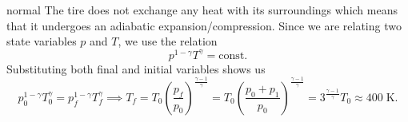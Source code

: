 \begin{solution}{normal}
The tire does not exchange any heat with its surroundings which means that it undergoes an adiabatic expansion/compression. Since we are relating two state variables $p$ and $T$, we use the relation
\[p^{1 - \gamma}T^{\gamma} = \text{const.}\]Substituting both final and initial variables shows us
\[p_0^{1 - \gamma} T_0^{\gamma} = p_f^{1 - \gamma} T_f^{\gamma}\implies T_f = T_0 \left(\frac{p_f}{p_0}\right)^{\frac{\gamma - 1}{\gamma}} = T_0 \left(\frac{p_0 + p_1}{p_0}\right)^{\frac{\gamma - 1}{\gamma}} = 3^{\frac{\gamma - 1}{\gamma}} T_0\approx 400\;\mathrm{K}.\]
\end{solution}